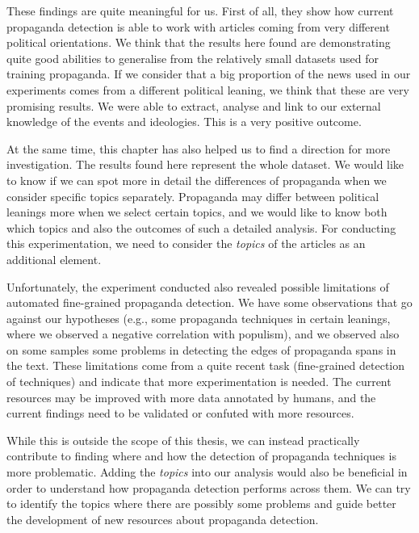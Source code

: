 These findings are quite meaningful for us.
First of all, they show how current propaganda detection is able to work with articles coming from very different political orientations. We think that the results here found are demonstrating quite good abilities to generalise from the relatively small datasets used for training propaganda.
If we consider that a big proportion of the news used in our experiments comes from a different political leaning, we think that these are very promising results.
We were able to extract, analyse and link to our external knowledge of the events and ideologies. This is a very positive outcome.

At the same time, this chapter has also helped us to find a direction for more investigation. The results found here represent the whole dataset. We would like to know if we can spot more in detail the differences of propaganda when we consider specific topics separately. Propaganda may differ between political leanings more when we select certain topics, and we would like to know both which topics and also the outcomes of such a detailed analysis. For conducting this experimentation, we need to consider the \emph{topics} of the articles as an additional element.

Unfortunately, the experiment conducted also revealed possible limitations of automated fine-grained propaganda detection.
We have some observations that go against our hypotheses (e.g., some propaganda techniques in certain leanings, where we observed a negative correlation with populism), and we observed also on some samples some problems in detecting the edges of propaganda spans in the text.
These limitations come from a quite recent task (fine-grained detection of techniques) and indicate that more experimentation is needed. The current resources may be improved with more data annotated by humans, and the current findings need to be validated or confuted with more resources.

While this is outside the scope of this thesis, we can instead practically contribute to finding where and how the detection of propaganda techniques is more problematic.
Adding the \emph{topics} into our analysis would also be beneficial in order to understand how propaganda detection performs across them.
We can try to identify the topics where there are possibly some problems and guide better the development of new resources about propaganda detection.


